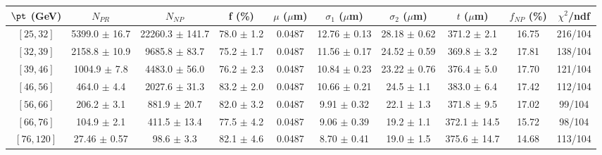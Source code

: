 \begin{tabular}{c||c|c|c|c|c|c|c||c|c}
$\pt$ (GeV) & $N_{PR}$ & $N_{NP}$ & f (\%) & $\mu$ ($\mu$m) & $\sigma_1$ ($\mu$m) & $\sigma_2$ ($\mu$m)  & $t$ ($\mu$m) & $f_{NP}$ (\%) & $\chi^2$/ndf \\
\hline
$[25, 32]$ & 5399.0 $\pm$ 16.7 & 22260.3 $\pm$ 141.7 & 78.0 $\pm$ 1.2 & 0.0487 & 12.76 $\pm$ 0.13 & 28.18 $\pm$ 0.62 & 371.2 $\pm$ 2.1 & 16.75 & 216/104\\
$[32, 39]$ & 2158.8 $\pm$ 10.9 & 9685.8 $\pm$ 83.7 & 75.2 $\pm$ 1.7 & 0.0487 & 11.56 $\pm$ 0.17 & 24.52 $\pm$ 0.59 & 369.8 $\pm$ 3.2 & 17.81 & 138/104\\
$[39, 46]$ & 1004.9 $\pm$ 7.8 & 4483.0 $\pm$ 56.0 & 76.2 $\pm$ 2.3 & 0.0487 & 10.84 $\pm$ 0.23 & 23.22 $\pm$ 0.76 & 376.4 $\pm$ 5.0 & 17.70 & 121/104\\
$[46, 56]$ & 464.0 $\pm$ 4.4 & 2027.6 $\pm$ 31.3 & 83.2 $\pm$ 2.0 & 0.0487 & 10.66 $\pm$ 0.21 & 24.5 $\pm$ 1.1 & 383.0 $\pm$ 6.4 & 17.42 & 112/104\\
$[56, 66]$ & 206.2 $\pm$ 3.1 & 881.9 $\pm$ 20.7 & 82.0 $\pm$ 3.2 & 0.0487 & 9.91 $\pm$ 0.32 & 22.1 $\pm$ 1.3 & 371.8 $\pm$ 9.5 & 17.02 & 99/104\\
$[66, 76]$ & 104.9 $\pm$ 2.1 & 411.5 $\pm$ 13.4 & 77.5 $\pm$ 4.2 & 0.0487 & 9.06 $\pm$ 0.39 & 19.2 $\pm$ 1.1 & 372.1 $\pm$ 14.5 & 15.72 & 98/104\\
$[76, 120]$ & 27.46 $\pm$ 0.57 & 98.6 $\pm$ 3.3 & 82.1 $\pm$ 4.6 & 0.0487 & 8.70 $\pm$ 0.41 & 19.0 $\pm$ 1.5 & 375.6 $\pm$ 14.7 & 14.68 & 113/104\\
\end{tabular}
